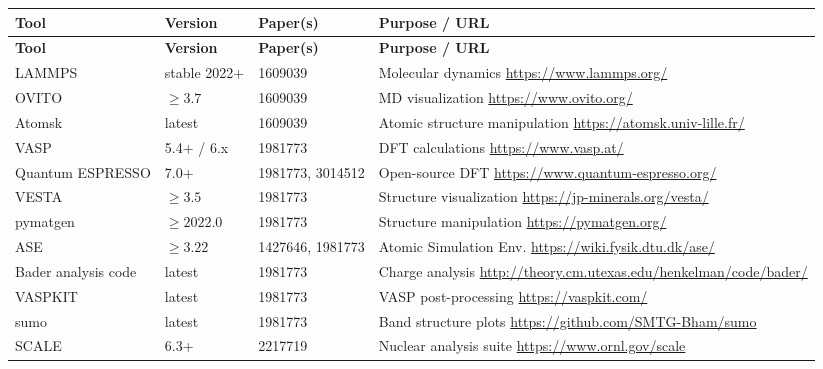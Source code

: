\documentclass[11pt,a4paper]{article}
\begin{document}
\begin{longtable}{p{4cm} p{2cm} p{3cm} p{4.5cm}}
\toprule
\textbf{Tool} & \textbf{Version} & \textbf{Paper(s)} & \textbf{Purpose / URL} \\
\midrule
\endfirsthead
\toprule
\textbf{Tool} & \textbf{Version} & \textbf{Paper(s)} & \textbf{Purpose / URL} \\
\midrule
\endhead
LAMMPS & stable 2022+ & 1609039 & Molecular dynamics \newline \url{https://www.lammps.org/} \\
\midrule
OVITO & $\geq 3.7$ & 1609039 & MD visualization \newline \url{https://www.ovito.org/} \\
\midrule
Atomsk & latest & 1609039 & Atomic structure manipulation \newline \url{https://atomsk.univ-lille.fr/} \\
\midrule
VASP & 5.4+ / 6.x & 1981773 & DFT calculations \newline \url{https://www.vasp.at/} \\
\midrule
Quantum ESPRESSO & 7.0+ & 1981773, 3014512 & Open-source DFT \newline \url{https://www.quantum-espresso.org/} \\
\midrule
VESTA & $\geq 3.5$ & 1981773 & Structure visualization \newline \url{https://jp-minerals.org/vesta/} \\
\midrule
pymatgen & $\geq 2022.0$ & 1981773 & Structure manipulation \newline \url{https://pymatgen.org/} \\
\midrule
ASE & $\geq 3.22$ & 1427646, 1981773 & Atomic Simulation Env. \newline \url{https://wiki.fysik.dtu.dk/ase/} \\
\midrule
Bader analysis code & latest & 1981773 & Charge analysis \newline \url{http://theory.cm.utexas.edu/henkelman/code/bader/} \\
\midrule
VASPKIT & latest & 1981773 & VASP post-processing \newline \url{https://vaspkit.com/} \\
\midrule
sumo & latest & 1981773 & Band structure plots \newline \url{https://github.com/SMTG-Bham/sumo} \\
\midrule
SCALE & 6.3+ & 2217719 & Nuclear analysis suite \newline \url{https://www.ornl.gov/scale} \\

\end{longtable}
\end{document}
